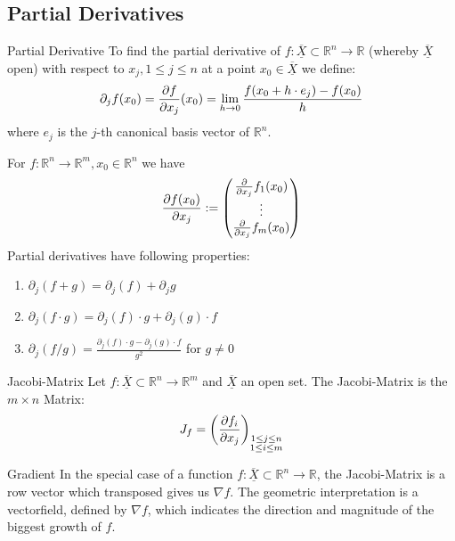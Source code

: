 \documentclass[a4paper,fontsize = 10pt]{article}
\def\R{\mathbb{R}}
\def\X{\underline{\overline{X}}}
\begin{document}
\subsection{Partial Derivatives}
\begin{mainbox}{Partial Derivative}
    To find the partial derivative of \(f: \X \subset \R^n \to \R\) (whereby \(\X\) open) with respect to $x_j, 1 \leq j \leq n$ at a point $x_0 \in \X$ we define:
\[\partial_j f (x_0)= \pdv{f}{x_{j}}(x_0) = \lim_{h \to 0} \frac{f(x_0 + h\cdot e_j) - f(x_0)}{h}\]where $e_j$ is the $j$-th canonical basis vector of $\R^n$.
\end{mainbox}
 
For \(f: \R^n \to \R^m, x_0 \in \R^n\) we have
\begin{align*}
  \pdv{f(x_0)}{x_j} := \begin{pmatrix}
    \pdv*{f_1(x_0)}{x_j}\\
    \vdots\\
    \pdv*{f_m(x_0)}{x_j}\\
  \end{pmatrix}
\end{align*}
Partial derivatives have following properties:
\begin{enumerate}
  \item \(\partial_j(f + g) = \partial_j (f) + \partial_j g\)
  \item \(\partial_j(f \cdot g) = \partial_j (f) \cdot g + \partial_j (g) \cdot f\)
  \item \(\partial_j(f / g) = \frac{\partial_j (f) \cdot g - \partial_j (g) \cdot f}{g^2}\) for \(g \ne 0\)
\end{enumerate}
\begin{mainbox}{Jacobi-Matrix}
Let \(f: \X \subset \R^n \to \R^m\) and \(\X\) an open set. The Jacobi-Matrix is the \(m \times n\) Matrix:
\[J_f = \left( \pdv{f_i}{x_j} \right)_{\substack{1 \leq j \leq n \\ 1 \leq i \leq m}}\]
\end{mainbox}
\begin{mainbox}{Gradient}
    In the special case of a function \(f: \X \subset \R^n \to \R\), the Jacobi-Matrix is a row vector which transposed gives us \(\nabla f\). The geometric interpretation is a vectorfield, defined by $\nabla f$, which indicates the direction and magnitude of the biggest growth of $f$. 
\end{mainbox}

\end{document}
